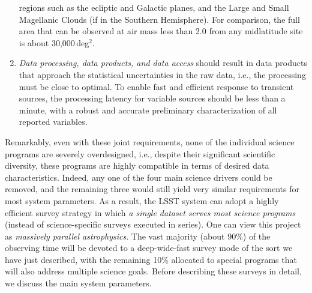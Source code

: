 \begin{enumerate}
   regions such as the ecliptic and Galactic planes, and the Large and Small
   Magellanic Clouds (if in the Southern Hemisphere).  For comparison,
   the full area that can be observed at air mass less than 2.0 from
   any midlatitude site is about 30,000\,deg$^2$.
\item  \emph{Data processing, data products, and data access} should
  result in data products that approach the statistical uncertainties
  in the raw data, i.e., the processing must be close to optimal.
To enable fast and efficient response to
   transient sources, the processing latency for variable sources should be less than a minute,
   with a robust and accurate preliminary characterization
   of all reported variables.
\end{enumerate}

Remarkably, even with these joint requirements, none of the
individual science programs are severely overdesigned, i.e., despite
their significant scientific diversity, these programs are highly
compatible in terms of desired data characteristics. Indeed, any one
of the four main science drivers could be removed, and the remaining
three would still yield very similar requirements for most system
parameters. As a result, the LSST system can adopt a highly
efficient survey strategy in which \textit{a single dataset serves most science
programs} (instead of science-specific surveys executed in series).
One can view this project as \textit{massively parallel astrophysics}.
The vast majority (about 90\%) of the observing time will be devoted to
a deep-wide-fast survey mode of the sort we have just described, with
the remaining 10\%
allocated to special programs that will also address multiple science
goals. Before describing these surveys in detail, we discuss the main
system parameters.


